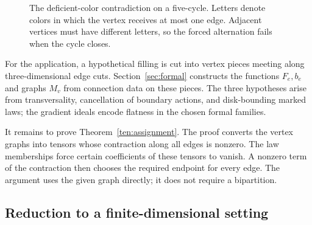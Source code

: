 \begin{figure}[hbp]
\centering
{}
\caption{The deficient-color contradiction on a five-cycle.
Letters denote colors in which the vertex receives at most one edge.
Adjacent vertices must have different letters, so the forced alternation
fails when the cycle closes.}\label{ten:cycle-figure}
\end{figure}

For the application, a hypothetical filling is cut into vertex pieces
meeting along three-dimensional edge cuts.  Section~\ref{sec:formal}
constructs the functions \(F_e,b_e\) and graphs \(M_v\) from connection
data on these pieces.  The three hypotheses arise from transversality,
cancellation of boundary actions, and disk-bounding marked laws; the
gradient ideals encode flatness in the chosen formal families.

It remains to prove Theorem~\ref{ten:assignment}.  The proof converts
the vertex graphs into tensors whose contraction along
all edges is nonzero.  The law memberships force certain coefficients of
these tensors to vanish.  A nonzero term of the contraction then chooses
the required endpoint for every edge.  The argument uses the given graph
directly; it does not require a bipartition.

\subsection{Reduction to a finite-dimensional setting}

